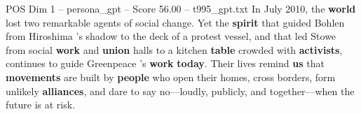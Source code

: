 \begin{textsample}{POS Dim 1 – persona\_gpt – Score 56.00 – t995\_gpt.txt}
In July 2010, the \textbf{world} lost two remarkable agents of social change.
Yet the \textbf{spirit} that guided Bohlen from Hiroshima ’s shadow to the deck of a protest vessel, and that led Stowe from social \textbf{work} and \textbf{union} halls to a kitchen \textbf{table} crowded with \textbf{activists}, continues to guide Greenpeace ’s \textbf{work} \textbf{today}.
Their lives remind \textbf{us} that \textbf{movements} are built by \textbf{people} who open their homes, cross borders, form unlikely \textbf{alliances}, and dare to say no—loudly, publicly, and together—when the future is at risk.

\end{textsample}
